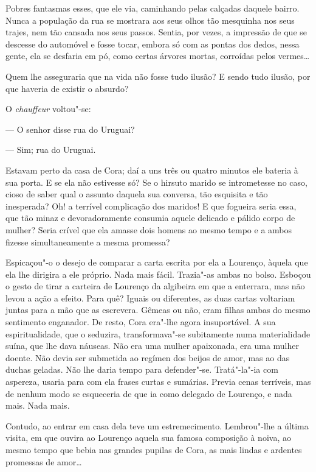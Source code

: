 Pobres fantasmas esses, que ele via, caminhando pelas calçadas daquele
bairro. Nunca a população da rua se mostrara aos seus olhos tão
mesquinha nos seus trajes, nem tão cansada nos seus passos. Sentia, por
vezes, a impressão de que se descesse do automóvel e fosse tocar, embora
só com as pontas dos dedos, nessa gente, ela se desfaria em pó, como
certas árvores mortas, corroídas pelos vermes\ldots{}

Quem lhe asseguraria que na vida não fosse tudo ilusão? E sendo tudo
ilusão, por que haveria de existir o absurdo?

O \emph{chauffeur} voltou"-se:

--- O senhor disse rua do Uruguai?

--- Sim; rua do Uruguai.

Estavam perto da casa de Cora; daí a uns três ou quatro minutos ele
bateria à sua porta. E se ela não estivesse só? Se o hirsuto marido se
intrometesse no caso, cioso de saber qual o assunto daquela sua
conversa, tão esquisita e tão inesperada? Oh! a terrível complicação dos
maridos! E que fogueira seria essa, que tão minaz e devoradoramente
consumia aquele delicado e pálido corpo de mulher? Seria crível que ela
amasse dois homens ao mesmo tempo e a ambos fizesse simultaneamente a
mesma promessa?

Espicaçou"-o o desejo de comparar a carta escrita por ela a Lourenço,
àquela que ela lhe dirigira a ele próprio. Nada mais fácil. Trazia"-as
ambas no bolso. Esboçou o gesto de tirar a carteira de Lourenço da
algibeira em que a enterrara, mas não levou a ação a efeito. Para quê?
Iguais ou diferentes, as duas cartas voltariam juntas para a mão que as
escrevera. Gêmeas ou não, eram filhas ambas do mesmo sentimento
enganador. De resto, Cora era"-lhe agora insuportável. A sua
espiritualidade, que o seduzira, transformava"-se subitamente numa
materialidade suína, que lhe dava náuseas. Não era uma mulher
apaixonada, era uma mulher doente. Não devia ser submetida ao regímen
dos beijos de amor, mas ao das duchas geladas. Não lhe daria tempo para
defender"-se. Tratá"-la"-ia com aspereza, usaria para com ela frases curtas
e sumárias. Previa cenas terríveis, mas de nenhum modo se esqueceria de
que ia como delegado de Lourenço, e nada mais. Nada mais.

Contudo, ao entrar em casa dela teve um estremecimento. Lembrou"-lhe a
última visita, em que ouvira ao Lourenço aquela sua famosa composição à
noiva, ao mesmo tempo que bebia nas grandes pupilas de Cora, as mais
lindas e ardentes promessas de amor\ldots{}

